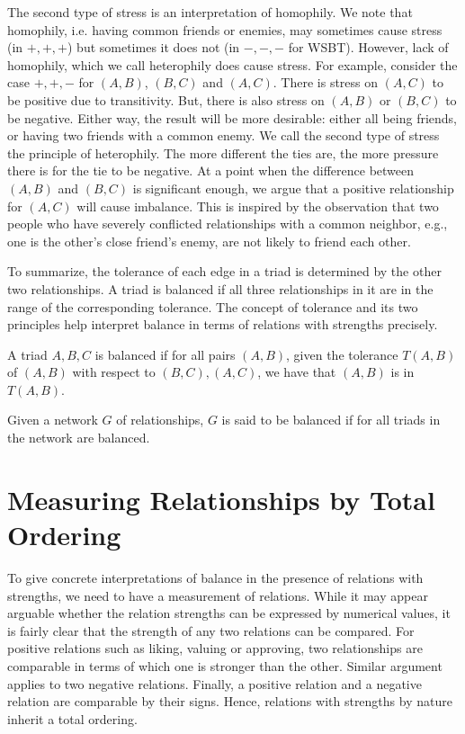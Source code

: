 The second type of stress is an interpretation of homophily. We note
that homophily, i.e. having common friends or enemies, may sometimes
cause stress (in $+,+,+$) but sometimes it does not (in $-,-,-$ for
WSBT). However, lack of homophily, which we call heterophily does
cause stress. For example, consider the case $+,+,-$ for $(A,B)$,
$(B,C)$ and $(A,C)$. There is stress on $(A,C)$ to be positive due to
transitivity. But, there is also stress on $(A,B)$ or $(B,C)$ to be
negative. Either way, the result will be more desirable: either all
being friends, or having two friends with a common enemy. We call the
second type of stress the principle of heterophily. The more different
the ties are, the more pressure there is
for the tie to be negative.  At a point when the difference between
$(A,B)$ and $(B,C)$ is significant enough, we argue that a positive
relationship for $(A,C)$ will cause imbalance. This is inspired by the
observation that two people who have severely conflicted relationships
with a common neighbor, e.g., one is the other's close friend's enemy,
are not likely to friend each other.

To summarize, the tolerance of each edge in a triad is determined by the other two relationships. A triad is balanced if all three relationships in it are in the range of the corresponding tolerance. The concept of tolerance and its two principles help interpret balance in terms of relations with
strengths precisely. 

\begin{definition} [Balance]
A triad $A,B,C$ is balanced if for all pairs $(A,B)$, given the
tolerance $T(A,B)$ of $(A,B)$ with respect to $(B,C),(A,C)$,
we have that $(A,B)$ is in $T(A,B)$. 

Given a network $G$ of relationships, $G$ is said to be balanced if
for all triads in the network are balanced.
\end{definition}
\section{Measuring Relationships by Total Ordering}
To give concrete interpretations of balance in the presence of relations with strengths, we need to have a measurement of
relations. While it may appear arguable whether
the relation strengths can be expressed by numerical values, it is fairly
clear that the strength of any two relations can be compared. For
positive relations such as liking, valuing or approving, two
relationships are comparable in terms of which one is stronger than
the other. Similar argument applies to two negative
relations. Finally, a positive relation and a negative relation are
comparable by their signs. Hence, relations with strengths by nature
inherit a total ordering.
 
